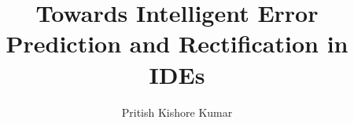 \documentclass[sigplan,screen,9pt]{acmart}
\begin{document}
\title{Towards Intelligent Error Prediction and Rectification in IDEs}

\author{Pritish Kishore Kumar}




\maketitle
\end{document}
